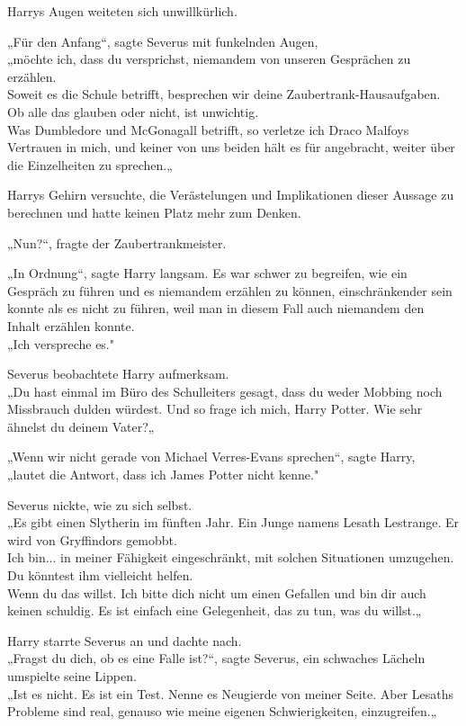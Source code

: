 {Harrys Augen weiteten sich unwillkürlich.

„Für den Anfang“, sagte Severus mit funkelnden Augen,\\ „möchte ich, dass du versprichst, niemandem von unseren Gesprächen zu erzählen.\\ Soweit es die Schule betrifft, besprechen wir deine Zaubertrank-Hausaufgaben. Ob alle das glauben oder nicht, ist unwichtig.\\ Was Dumbledore und McGonagall betrifft, so verletze ich Draco Malfoys Vertrauen in mich, und keiner von uns beiden hält es für angebracht, weiter über die Einzelheiten zu sprechen.„

Harrys Gehirn versuchte, die Verästelungen und Implikationen dieser Aussage zu berechnen und hatte keinen Platz mehr zum Denken.

„Nun?“, fragte der Zaubertrankmeister.

„In Ordnung“, sagte Harry langsam. Es war schwer zu begreifen, wie ein Gespräch zu führen und es niemandem erzählen zu können, einschränkender sein konnte als es nicht zu führen, weil man in diesem Fall auch niemandem den Inhalt erzählen konnte.\\ „Ich verspreche es."

Severus beobachtete Harry aufmerksam.\\ „Du hast einmal im Büro des Schulleiters gesagt, dass du weder Mobbing noch Missbrauch dulden würdest. Und so frage ich mich, Harry Potter. Wie sehr ähnelst du deinem Vater?„

„Wenn wir nicht gerade von Michael Verres-Evans sprechen“, sagte Harry,\\ „lautet die Antwort, dass ich James Potter nicht kenne."

Severus nickte, wie zu sich selbst.\\ „Es gibt einen Slytherin im fünften Jahr. Ein Junge namens Lesath Lestrange. Er wird von Gryffindors gemobbt.\\ Ich bin... in meiner Fähigkeit eingeschränkt, mit solchen Situationen umzugehen. Du könntest ihm vielleicht helfen.\\ Wenn du das willst. Ich bitte dich nicht um einen Gefallen und bin dir auch keinen schuldig. Es ist einfach eine Gelegenheit, das zu tun, was du willst.„

Harry starrte Severus an und dachte nach.\\ „Fragst du dich, ob es eine Falle ist?“, sagte Severus, ein schwaches Lächeln umspielte seine Lippen.\\ „Ist es nicht. Es ist ein Test. Nenne es Neugierde von meiner Seite. Aber Lesaths Probleme sind real, genauso wie meine eigenen Schwierigkeiten, einzugreifen.„

}
